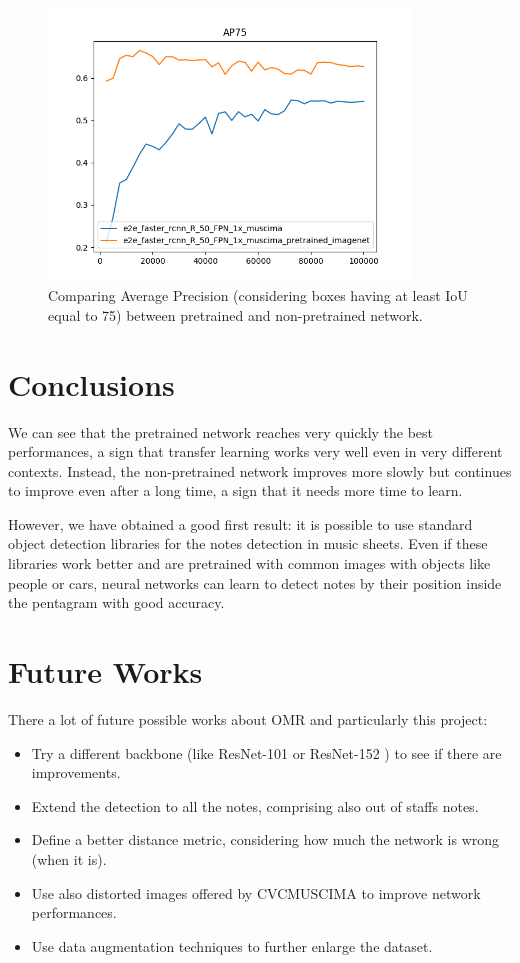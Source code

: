 \documentclass[journal]{IEEEtran}
\begin{document}
	\begin{figure} [h]
		\begin{center}
			\includegraphics[width=3.8in]{img/AP75.png}
			\caption{Comparing Average Precision (considering boxes having at least IoU equal to 75) between pretrained and non-pretrained network.}
			\label{fig:AP75}
		\end{center}
	\end{figure}

	\section{Conclusions}
	We can see that the pretrained network reaches very quickly the best performances, a sign that transfer learning \cite{transfer-learning} works very well even in very different contexts. Instead, the non-pretrained network improves more slowly but continues to improve even after a long time, a sign that it needs more time to learn.
	
	However, we have obtained a good first result: it is possible to use standard object detection libraries for the notes detection in music sheets. Even if these libraries work better and are pretrained with common images with objects like people or cars, neural networks can learn to detect notes by their position inside the pentagram with good accuracy.
	
	\section{Future Works}
	There a lot of future possible works about OMR and particularly this project:
	\begin{itemize}
		\item Try a different backbone (like ResNet-101 or ResNet-152 \cite{RESNET}) to see if there are improvements.
		\item Extend the detection to all the notes, comprising also out of staffs notes.
		\item Define a better distance metric, considering how much the network is wrong (when it is).
		\item Use also distorted images offered by CVCMUSCIMA to improve network performances.
		\item Use data augmentation techniques to further enlarge the dataset.
	\end{itemize}
	
\end{document}
